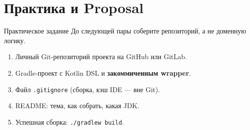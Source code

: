 \section{Практика и Proposal}

\begin{frame}{Практическое задание}
  До следующей пары соберите репозиторий, а не доменную логику.

  \medskip
  \begin{enumerate}\setlength\itemsep{0.4em}
    \item Личный Git-репозиторий проекта на GitHub или GitLab.
    \item Gradle-проект с Kotlin DSL и \textbf{закоммиченным wrapper}.
    \item Файл \texttt{.gitignore} (сборка, кэш IDE --- вне Git).
    \item README: тема, как собрать, какая JDK.
    \item Успешная сборка: \texttt{./gradlew build}.
  \end{enumerate}
\end{frame}
